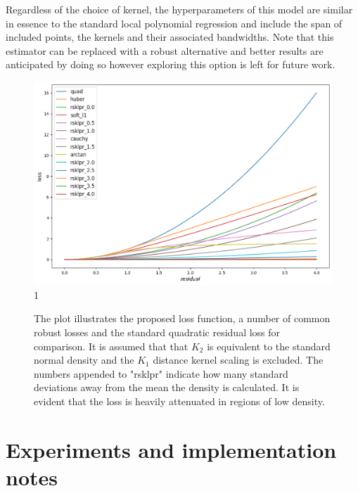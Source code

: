 \documentclass[preprint,1p,times]{elsarticle}
\begin{document}
Regardless of the choice of kernel, the hyperparameters of this model are similar in essence to the standard local polynomial regression and include the span of included points, the kernels and their associated bandwidths. Note that this estimator can be replaced with a robust alternative and better results are anticipated by doing so however exploring this option is left for future work.

\begin{figure}[t]
\caption{The plot illustrates the proposed loss function, a number of common robust losses and the standard quadratic residual loss for comparison. It is assumed that that $K_2$ is equivalent to the standard normal density and the $K_1$ distance kernel scaling is excluded. The numbers appended to "rsklpr" indicate how many standard deviations away from the mean the density is calculated. It is evident that the loss is heavily attenuated in regions of low density.}
\centering
\includegraphics[width=1.0\textwidth]{losses_1d.png}1
\end{figure}

\section{Experiments and implementation notes}
\label{S:Experiments and implementation notes}
\end{document}
